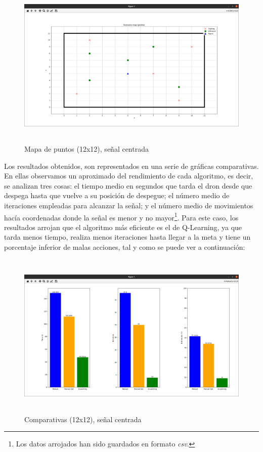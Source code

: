 \begin{figure} [H]
    \begin{center}
    \includegraphics[height=8cm]{imagenes/cap4/17_mapa_p_centro_12.png}
    \end{center}
    \caption[Mapa de puntos (12x12), señal centrada]{Mapa de puntos (12x12), señal centrada}
    \label{fig:map_p_center_12}
\end{figure}

Los resultados obtenidos, son representados en una serie de gráficas comparativas. En ellas observamos un aproximado del rendimiento de cada algoritmo, es decir, se analizan tres cosas: el tiempo medio en segundos que tarda el dron desde que despega hasta que vuelve a su posición de despegue; el número medio de iteraciones empleadas para alcanzar la señal; y el número medio de movimientos hacía coordenadas donde la señal es menor y no mayor\footnote[4]{Los datos arrojados han sido guardados en formato \emph{csv}.}.  Para este caso, los resultados arrojan que el algoritmo más eficiente es el de Q-Learning, ya que tarda menos tiempo, realiza menos iteraciones hasta llegar a la meta y tiene un porcentaje inferior de malas acciones, tal y como se puede ver a continuación:\\

\begin{figure} [H]
    \begin{center}
    \includegraphics[height=8cm]{imagenes/cap4/18_comp_centro_12.png}
    \end{center}
    \caption[Comparativas (12x12), señal centrada]{Comparativas (12x12), señal centrada}
    \label{fig:comp_center_12}
\end{figure}


